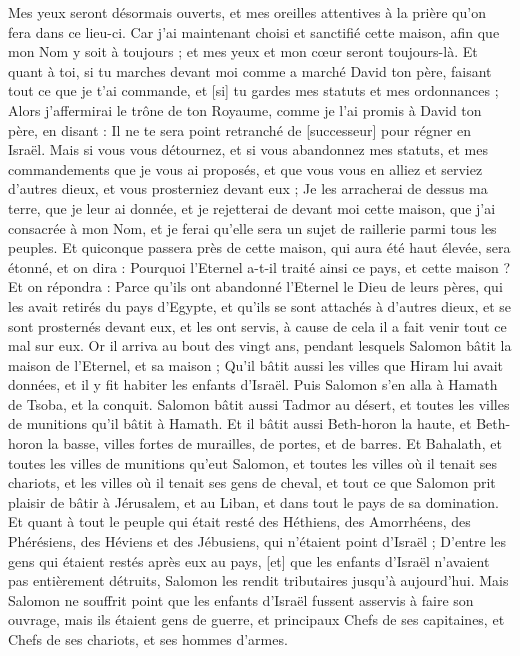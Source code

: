 \begin{multicols}{2}
Mes yeux seront désormais ouverts, et mes oreilles attentives à la prière qu'on fera dans ce lieu-ci.
Car j'ai maintenant choisi et sanctifié cette maison, afin que mon Nom y soit à toujours ; et mes yeux et mon cœur seront toujours-là.
Et quant à toi, si tu marches devant moi comme a marché David ton père, faisant tout ce que je t'ai commande, et [si] tu gardes mes statuts et mes ordonnances ;
Alors j'affermirai le trône de ton Royaume, comme je l'ai promis à David ton père, en disant : Il ne te sera point retranché de [successeur] pour régner en Israël.
Mais si vous vous détournez, et si vous abandonnez mes statuts, et mes commandements que je vous ai proposés, et que vous vous en alliez et serviez d'autres dieux, et vous prosterniez devant eux ;
Je les arracherai de dessus ma terre, que je leur ai donnée, et je rejetterai de devant moi cette maison, que j'ai consacrée à mon Nom, et je ferai qu'elle sera un sujet de raillerie parmi tous les peuples.
Et quiconque passera près de cette maison, qui aura été haut élevée, sera étonné, et on dira : Pourquoi l'Eternel a-t-il traité ainsi ce pays, et cette maison ?
Et on répondra : Parce qu'ils ont abandonné l'Eternel le Dieu de leurs pères, qui les avait retirés du pays d'Egypte, et qu'ils se sont attachés à d'autres dieux, et se sont prosternés devant eux, et les ont servis, à cause de cela il a fait venir tout ce mal sur eux.
\VerseOne{}Or il arriva au bout des vingt ans, pendant lesquels Salomon bâtit la maison de l'Eternel, et sa maison ;
Qu'il bâtit aussi les villes que Hiram lui avait données, et il y fit habiter les enfants d'Israël.
Puis Salomon s'en alla à Hamath de Tsoba, et la conquit.
Salomon bâtit aussi Tadmor au désert, et toutes les villes de munitions qu'il bâtit à Hamath.
Et il bâtit aussi Beth-horon la haute, et Beth-horon la basse, villes fortes de murailles, de portes, et de barres.
Et Bahalath, et toutes les villes de munitions qu'eut Salomon, et toutes les villes où il tenait ses chariots, et les villes où il tenait ses gens de cheval, et tout ce que Salomon prit plaisir de bâtir à Jérusalem, et au Liban, et dans tout le pays de sa domination.
Et quant à tout le peuple qui était resté des Héthiens, des Amorrhéens, des Phérésiens, des Héviens et des Jébusiens, qui n'étaient point d'Israël ;
D'entre les gens qui étaient restés après eux au pays, [et] que les enfants d'Israël n'avaient pas entièrement détruits, Salomon les rendit tributaires jusqu'à aujourd'hui.
Mais Salomon ne souffrit point que les enfants d'Israël fussent asservis à faire son ouvrage, mais ils étaient gens de guerre, et principaux Chefs de ses capitaines, et Chefs de ses chariots, et ses hommes d'armes.

\end{multicols}
